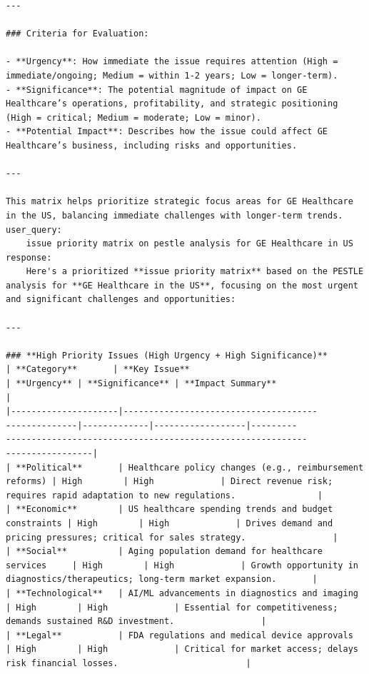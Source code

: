 \begin{instructbox}
\begin{lstlisting}[breakindent=0pt, breaklines=true, breakatwhitespace=true, frame=single, backgroundcolor=\color{green!10}]
---

### Criteria for Evaluation:

- **Urgency**: How immediate the issue requires attention (High = immediate/ongoing; Medium = within 1-2 years; Low = longer-term).
- **Significance**: The potential magnitude of impact on GE Healthcare’s operations, profitability, and strategic positioning (High = critical; Medium = moderate; Low = minor).
- **Potential Impact**: Describes how the issue could affect GE Healthcare’s business, including risks and opportunities.

---

This matrix helps prioritize strategic focus areas for GE Healthcare in the US, balancing immediate challenges with longer-term trends.
user_query:
    issue priority matrix on pestle analysis for GE Healthcare in US
response:
    Here's a prioritized **issue priority matrix** based on the PESTLE analysis for **GE Healthcare in the US**, focusing on the most urgent and significant challenges and opportunities:

---

### **High Priority Issues (High Urgency + High Significance)**  
| **Category**       | **Key Issue**                                      | **Urgency** | **Significance** | **Impact Summary**                                                                 |
|---------------------|--------------------------------------
--------------|-------------|------------------|---------
-----------------------------------------------------------
-----------------|
| **Political**       | Healthcare policy changes (e.g., reimbursement reforms) | High        | High             | Direct revenue risk; requires rapid adaptation to new regulations.                |
| **Economic**        | US healthcare spending trends and budget constraints | High        | High             | Drives demand and pricing pressures; critical for sales strategy.                 |
| **Social**          | Aging population demand for healthcare services     | High        | High             | Growth opportunity in diagnostics/therapeutics; long-term market expansion.       |
| **Technological**   | AI/ML advancements in diagnostics and imaging      | High        | High             | Essential for competitiveness; demands sustained R&D investment.                 |
| **Legal**           | FDA regulations and medical device approvals        | High        | High             | Critical for market access; delays risk financial losses.                         |


\end{lstlisting}
\end{instructbox}
